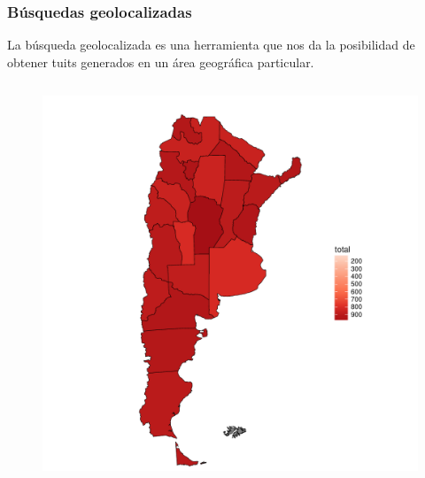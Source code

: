\begin{frame}[t]\frametitle{Búsquedas geolocalizadas}

La búsqueda geolocalizada es una herramienta que nos da la posibilidad de obtener tuits generados en un área geográfica particular. 


\begin{columns}
    \begin{column}{0.30\textwidth}
        \begin{figure}
            \includegraphics[width=\linewidth]{../src/images/mapaprovincias.pdf}
            \label{fig:mapaProvincias}
        \end{figure}
    \end{column}


\end{columns}
\end{frame}
